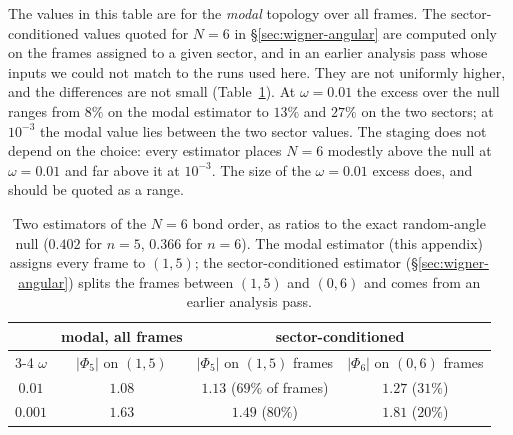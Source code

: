 The values in this table are for the \emph{modal} topology over all frames. The
sector-conditioned values quoted for $N{=}6$ in \S\ref{sec:wigner-angular} are computed only on
the frames assigned to a given sector, and in an earlier analysis pass whose inputs we could
not match to the runs used here. They are not uniformly higher, and the differences are not
small (Table~\ref{tab:bondorder-estimators}). At $\omega=0.01$ the excess over the null ranges
from $8\%$ on the modal estimator to $13\%$ and $27\%$ on the two sectors; at $10^{-3}$ the
modal value lies between the two sector values. The staging does not depend on the choice:
every estimator places $N{=}6$ modestly above the null at $\omega=0.01$ and far above it at
$10^{-3}$. The size of the $\omega=0.01$ excess does, and should be quoted as a range.

\begin{table}[H]
\centering
\caption[Two bond-order estimators at $N{=}6$]{Two estimators of the $N{=}6$ bond order,
as ratios to the exact random-angle null ($0.402$ for $n{=}5$, $0.366$ for $n{=}6$). The
modal estimator (this appendix) assigns every frame to $(1,5)$; the sector-conditioned
estimator (\S\ref{sec:wigner-angular}) splits the frames between $(1,5)$ and $(0,6)$ and comes
from an earlier analysis pass.}
\label{tab:bondorder-estimators}
\small
\begin{tabular}{c ccc}
\toprule
 & modal, all frames & \multicolumn{2}{c}{sector-conditioned} \\
\cmidrule(lr){3-4}
$\omega$ & $|\Phi_5|$ on $(1,5)$ & $|\Phi_5|$ on $(1,5)$ frames & $|\Phi_6|$ on $(0,6)$ frames \\
\midrule
$0.01$  & $1.08$ & $1.13$ ($69\%$ of frames) & $1.27$ ($31\%$) \\
$0.001$ & $1.63$ & $1.49$ ($80\%$) & $1.81$ ($20\%$) \\
\bottomrule
\end{tabular}
\end{table}

